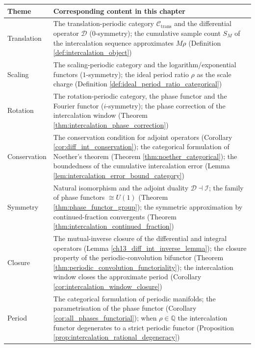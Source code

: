 \begin{center}
\begin{tabular}{>{\raggedright\arraybackslash}p{2.8cm}>{\raggedright\arraybackslash}p{9.9cm}}
\toprule
Theme & Corresponding content in this chapter \\
\midrule
Translation & The translation-periodic category $\mathcal{C}_{\text{trans}}$ and the differential operator $\mathcal{D}$ ($0$-symmetry); the cumulative sample count $S_M$ of the intercalation sequence approximates $M\rho$ (Definition \ref{def:intercalation_object}) \\
Scaling & The scaling-periodic category and the logarithm/exponential functors ($1$-symmetry); the ideal period ratio $\rho$ as the scale charge (Definition \ref{def:ideal_period_ratio_categorical}) \\
Rotation & The rotation-periodic category, the phase functor and the Fourier functor ($i$-symmetry); the phase correction of the intercalation window (Theorem \ref{thm:intercalation_phase_correction}) \\
Conservation & The conservation condition for adjoint operators (Corollary \ref{cor:diff_int_conservation}); the categorical formulation of Noether's theorem (Theorem \ref{thm:noether_categorical}); the boundedness of the cumulative intercalation error (Lemma \ref{lem:intercalation_error_bound_category}) \\
Symmetry & Natural isomorphism and the adjoint duality $\mathcal{D}\dashv\mathcal{I}$; the family of phase functors $\cong U(1)$ (Theorem \ref{thm:phase_functor_group}); the symmetric approximation by continued-fraction convergents (Theorem \ref{thm:intercalation_continued_fraction}) \\
Closure & The mutual-inverse closure of the differential and integral operators (Lemma \ref{ch13_diff_int_inverse_lemma}); the closure property of the periodic-convolution bifunctor (Theorem \ref{thm:periodic_convolution_functoriality}); the intercalation window closes the approximate period (Corollary \ref{cor:intercalation_window_closure}) \\
Period & The categorical formulation of periodic manifolds; the parametrisation of the phase functor (Corollary \ref{cor:all_phases_functorial}); when $\rho\in\mathbb{Q}$ the intercalation functor degenerates to a strict periodic functor (Proposition \ref{prop:intercalation_rational_degeneracy}) \\
\bottomrule
\end{tabular}
\end{center}

